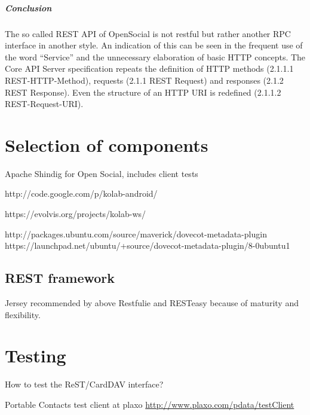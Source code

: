 \documentclass[12pt,a4paper]{scrartcl}		%
\begin{document}
\subparagraph{Conclusion}

The so called REST API of OpenSocial is not restful but rather another RPC
interface in another style. An indication of this can be seen in the frequent
use of the word ``Service'' and the unnecessary elaboration of basic HTTP
concepts.  The Core API Server specification repeats the definition of HTTP
methods (2.1.1.1 REST-HTTP-Method), requests (2.1.1 REST Request) and responses
(2.1.2 REST Response). Even the structure of an HTTP URI is redefined (2.1.1.2
REST-Request-URI).




\section{Selection of components}

Apache Shindig for Open Social, includes client tests

http://code.google.com/p/kolab-android/

https://evolvis.org/projects/kolab-ws/

http://packages.ubuntu.com/source/maverick/dovecot-metadata-plugin
https://launchpad.net/ubuntu/+source/dovecot-metadata-plugin/8-0ubuntu1



\subsection{REST framework}
Jersey recommended by \cite{Kaiser2011} above Restfulie and RESTeasy because of maturity and flexibility.


\section{Testing}
How to test the ReST/CardDAV interface?


Portable Contacts test client at plaxo \url{http://www.plaxo.com/pdata/testClient}
\end{document}
